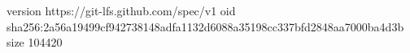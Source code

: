 version https://git-lfs.github.com/spec/v1
oid sha256:2a56a19499cf942738148adfa1132d6088a35198cc337bfd2848aa7000ba4d3b
size 104420
